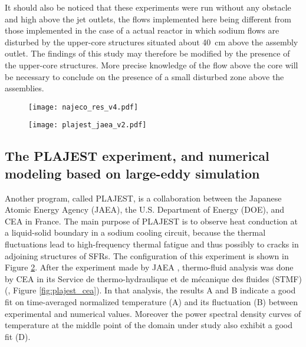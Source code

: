     It should also be noticed that these experiments were run without any obstacle and high above the jet outlets, the flows implemented here being different
from those implemented in the case of a actual reactor in which sodium flows are disturbed by the upper-core structures situated about 40~cm above the assembly
outlet. The findings of this study may therefore be modified by the presence of the upper-core structures. More precise knowledge of the flow above the core
will be necessary to conclude on the presence of a small disturbed zone above the assemblies.

    \begin{figure}[htbp]
        \centerline{\texttt{[image: najeco\_res\_v4.pdf]}}
        \label{fig:najeco_res}
    \end{figure}

    \begin{figure}[htbp]
        \centerline{\texttt{[image: plajest\_jaea\_v2.pdf]}}
        \label{fig:plajest_jaea}
    \end{figure}

\subsection{The PLAJEST experiment, and numerical modeling based on large-eddy simulation}
\label{ssec:PLAJEST}

    Another program, called PLAJEST, is a collaboration between the Japanese Atomic Energy Agency (JAEA), the U.S. Department of Energy (DOE), and CEA in France.
The main purpose of PLAJEST is to observe heat conduction at a liquid-solid boundary in a sodium cooling circuit, because the thermal fluctuations lead to
high-frequency thermal fatigue and thus possibly to cracks in adjoining structures of SFRs. The configuration of this experiment is shown in Figure
\ref{fig:plajest_jaea}. After the experiment made by JAEA \citep{Kimura2005Studyonconvective,Kimura2008Studyonthermal}, thermo-fluid analysis was
done by CEA in its Service de thermo-hydraulique et de m\'ecanique des fluides (STMF) (\cite{Angeli2015LargeEddySimulation}, Figure \ref{fig:plajest_cea}). In that analysis, the results A and B indicate a good fit on time-averaged
normalized temperature (A) and its fluctuation (B) between experimental and numerical values. Moreover the power spectral density curves of temperature at the
middle point of the domain under study also exhibit a good fit (D).

